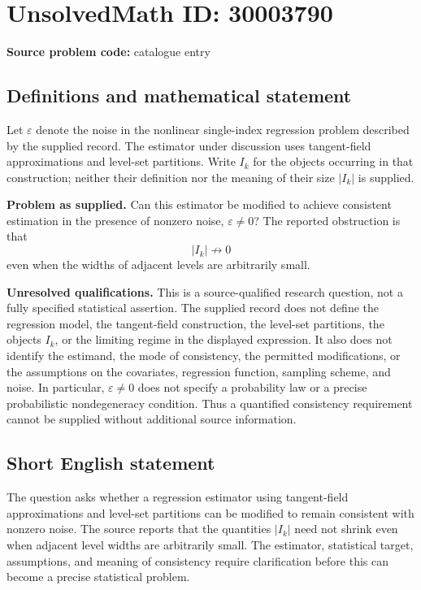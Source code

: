 \documentclass[11pt]{article}
\begin{document}
\section*{UnsolvedMath ID: 30003790}
\textbf{Source problem code:} catalogue entry
\subsection{Definitions and mathematical statement}
Let \(\varepsilon\) denote the noise in the nonlinear single-index regression problem described by the supplied record. The estimator under discussion uses tangent-field approximations and level-set partitions. Write \(I_k\) for the objects occurring in that construction; neither their definition nor the meaning of their size \(|I_k|\) is supplied.

\textbf{Problem as supplied.} Can this estimator be modified to achieve consistent estimation in the presence of nonzero noise, \(\varepsilon\ne0\)? The reported obstruction is that
\[
|I_k|\not\to0
\]
even when the widths of adjacent levels are arbitrarily small.

\textbf{Unresolved qualifications.} This is a source-qualified research question, not a fully specified statistical assertion. The supplied record does not define the regression model, the tangent-field construction, the level-set partitions, the objects \(I_k\), or the limiting regime in the displayed expression. It also does not identify the estimand, the mode of consistency, the permitted modifications, or the assumptions on the covariates, regression function, sampling scheme, and noise. In particular, \(\varepsilon\ne0\) does not specify a probability law or a precise probabilistic nondegeneracy condition. Thus a quantified consistency requirement cannot be supplied without additional source information.
\subsection{Short English statement}
The question asks whether a regression estimator using tangent-field approximations and level-set partitions can be modified to remain consistent with nonzero noise. The source reports that the quantities \(|I_k|\) need not shrink even when adjacent level widths are arbitrarily small. The estimator, statistical target, assumptions, and meaning of consistency require clarification before this can become a precise statistical problem.
\end{document}
